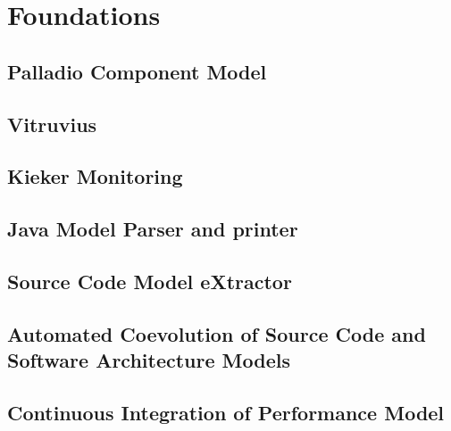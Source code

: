 

\chapter{Foundations}
\label{ch:Foundations}

\section{Palladio Component Model}
\label{sec:Palladio Component Model}

\section{Vitruvius}
\label{sec:Vitruvius}

\section{Kieker Monitoring}
\label{sec:Kieker Monitoring}

\section{Java Model Parser and printer}
\label{sec:Java Model Parser and printer}

\section{Source Code Model eXtractor}
\label{sec:Source Code Model eXtractor}

\section{Automated Coevolution of Source Code and Software Architecture Models}
\label{sec:Automated Coevolution of Source Code and Software Architecture Models}

\section{Continuous Integration of Performance Model}
\label{sec:Continuous Integration of Performance Model}






